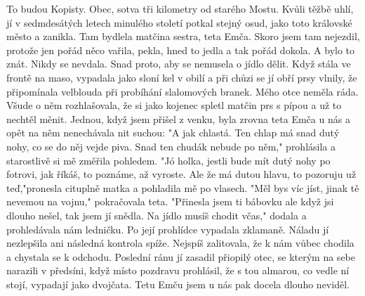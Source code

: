 
To budou Kopisty. Obec, sotva tři kilometry od starého Mostu. Kvůli
těžbě uhlí, jí v sedmdesátých letech minulého století potkal stejný
osud, jako toto královské město a zanikla. Tam bydlela matčina sestra,
teta Emča. Skoro jsem tam nejezdil, protože jen pořád něco vařila,
pekla, hned to jedla a tak pořád dokola. A bylo to znát. Nikdy se
nevdala. Snad proto, aby se nemusela o jídlo dělit. Když stála ve
frontě na maso, vypadala jako sloní kel v obilí a při chůzi se jí obří
prsy vlnily, že připomínala velblouda při probíhání slalomových
branek. Mého otce neměla ráda. Všude o něm rozhlašovala, že si jako
kojenec spletl matčin prs s pípou a už to nechtěl měnit. Jednou, když
jsem přišel z venku, byla zrovna teta Emča u nás a opět na něm
nenechávala nit suchou: "A jak chlastá. Ten chlap má snad dutý nohy,
co se do něj vejde piva. Snad ten chudák nebude po něm," prohlásila a
starostlivě si mě změřila pohledem. "Jó holka, jestli bude mít dutý
nohy po fotrovi, jak říkáš, to poznáme, až vyroste. Ale že má dutou
hlavu, to pozoruju už teď,"pronesla cituplně matka a pohladila mě po
vlasech. "Měl bys víc jíst, jinak tě nevemou na vojnu," pokračovala
teta. "Přinesla jsem ti bábovku ale když jsi dlouho nešel, tak jsem jí
snědla. Na jídlo musíš chodit včas," dodala a prohledávala nám
ledničku. Po její prohlídce vypadala zklamaně. Náladu jí nezlepšila
ani následná kontrola spíže. Nejspíš zalitovala, že k nám vůbec
chodila a chystala se k odchodu. Poslední ránu jí zasadil přiopilý
otec, se kterým na sebe narazili v předsíni, když místo pozdravu
prohlásil, že s tou almarou, co vedle ní stojí, vypadají jako
dvojčata. Tetu Emču jsem u nás pak docela dlouho neviděl.
